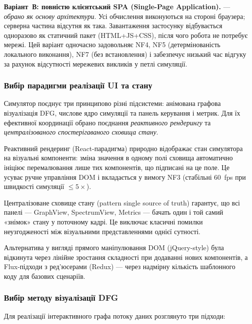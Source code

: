 \textbf{Варіант~В: повністю клієнтський SPA (Single-Page Application).}
--- \emph{обрано як основу архітектури}. Усі обчислення виконуються
на стороні браузера; серверна частина відсутня як така. Завантаження
застосунку відбувається одноразово як статичний пакет (HTML+JS+CSS),
після чого робота не потребує мережі. Цей варіант одночасно задовольняє
NF4, NF5 (детермінованість локального виконання), NF7 (без встановлення)
і забезпечує низький час відгуку за рахунок відсутності мережевих
викликів у петлі симуляції.

\subsubsection*{Вибір парадигми реалізації UI та стану}

Симулятор поєднує три принципово різні підсистеми: анімована
графова візуалізація DFG, числове ядро симуляції та панель керування
і метрик. Для їх ефективної координації обрано поєднання
\emph{реактивного рендерингу} та \emph{централізованого
спостерігаваного сховища стану}.

Реактивний рендеринг (React-парадигма) природно відображає
стан симулятора на візуальні компоненти: зміна значення в одному
полі сховища автоматично ініціює перемалювання лише тих компонентів,
що підписані на це поле. Це усуває ручне управління DOM і вкладається
у вимогу NF3 (стабільні 60~fps при швидкості симуляції $\le 5\times$).

Централізоване сховище стану (pattern single source of truth)
гарантує, що всі панелі --- GraphView, SpectrumView, Metrics ---
бачать один і той самий «знімок» стану у поточному кадрі. Це
виключає класичні помилки неузгодженості між візуальними
представленнями однієї сутності.

Альтернатива у вигляді прямого маніпулювання DOM (jQuery-style)
була відкинута через лінійне зростання складності при додаванні
нових компонентів, а Flux-підходи з ред'юсерами (Redux) --- через
надмірну кількість шаблонного коду для базових сценаріїв.

\subsubsection*{Вибір методу візуалізації DFG}

Для реалізації інтерактивного графа потоку даних розглянуто три
підходи:

